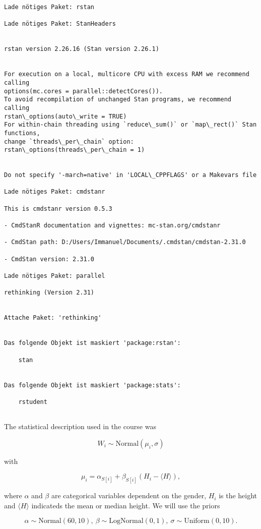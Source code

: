 \documentclass[11pt]{article}
\begin{document}
    \begin{Verbatim}[commandchars=\\\{\}]
Lade nötiges Paket: rstan

Lade nötiges Paket: StanHeaders


rstan version 2.26.16 (Stan version 2.26.1)


For execution on a local, multicore CPU with excess RAM we recommend calling
options(mc.cores = parallel::detectCores()).
To avoid recompilation of unchanged Stan programs, we recommend calling
rstan\_options(auto\_write = TRUE)
For within-chain threading using `reduce\_sum()` or `map\_rect()` Stan functions,
change `threads\_per\_chain` option:
rstan\_options(threads\_per\_chain = 1)


Do not specify '-march=native' in 'LOCAL\_CPPFLAGS' or a Makevars file

Lade nötiges Paket: cmdstanr

This is cmdstanr version 0.5.3

- CmdStanR documentation and vignettes: mc-stan.org/cmdstanr

- CmdStan path: D:/Users/Immanuel/Documents/.cmdstan/cmdstan-2.31.0

- CmdStan version: 2.31.0

Lade nötiges Paket: parallel

rethinking (Version 2.31)


Attache Paket: 'rethinking'


Das folgende Objekt ist maskiert 'package:rstan':

    stan


Das folgende Objekt ist maskiert 'package:stats':

    rstudent


    \end{Verbatim}

    The statistical description used in the course was

\[W_i \sim \text{Normal}(\mu_i, \sigma)\]

with

\[\mu_i = \alpha_{S[i]} + \beta_{S[i]}(H_i - \langle H \rangle),\]

where \(\alpha\) and \(\beta\) are categorical variables dependent on
the gender, \(H_i\) is the height and \(\langle H \rangle\) indicateds
the mean or median height. We will use the priors

\[\alpha \sim \text{Normal}(60, 10),\ \beta \sim \text{LogNormal}(0,1),\ \sigma \sim \text{Uniform}(0, 10).\]
\end{document}
